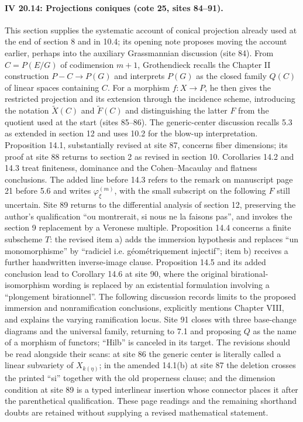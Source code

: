 \documentclass[10pt,a4paper]{article}
\begin{document}
\par{}
\paragraph{IV 20.14: Projections coniques (cote 25, sites 84--91).}
This section supplies the systematic account of conical projection already used at the end of section 8 and in 10.4; its opening note proposes moving the account earlier, perhaps into the auxiliary Grassmannian discussion (site 84). From $C=P(E/G)$ of codimension $m+1$, Grothendieck recalls the Chapter II construction $P-C\to P(G)$ and interprets $P(G)$ as the closed family $Q(C)$ of linear spaces containing $C$. For a morphism $f:X\to P$, he then gives the restricted projection and its extension through the incidence scheme, introducing the notation $\widetilde X(C)$ and $\widetilde F(C)$ and distinguishing the latter $F$ from the quotient used at the start (sites 85--86). The generic-center discussion recalls 5.3 as extended in section 12 and uses 10.2 for the blow-up interpretation. Proposition 14.1, substantially revised at site 87, concerns fiber dimensions; its proof at site 88 returns to section 2 as revised in section 10. Corollaries 14.2 and 14.3 treat finiteness, dominance and the Cohen--Macaulay and flatness conclusions. The added line before 14.3 refers to the remark on manuscript page 21 before 5.6 and writes $\varphi^{(m)}_\xi$, with the small subscript on the following $F$ still uncertain. Site 89 returns to the differential analysis of section 12, preserving the author's qualification ``ou montrerait, si nous ne la faisons pas'', and invokes the section 9 replacement by a Veronese multiple. Proposition 14.4 concerns a finite subscheme $T$: the revised item a) adds the immersion hypothesis and replaces ``un monomorphisme'' by ``radiciel i.e. géométriquement injectif''; item b) receives a further handwritten inverse-image clause. Proposition 14.5 and its added conclusion lead to Corollary 14.6 at site 90, where the original birational-isomorphism wording is replaced by an existential formulation involving a ``plongement birationnel''. The following discussion records limits to the proposed immersion and nonramification conclusions, explicitly mentions Chapter VIII, and explains the varying ramification locus. Site 91 closes with three base-change diagrams and the universal family, returning to 7.1 and proposing $Q$ as the name of a morphism of functors; ``Hilb'' is canceled in its target. The revisions should be read alongside their scans: at site 86 the generic center is literally called a linear subvariety of $X_{k(\eta)}$; in the amended 14.1(b) at site 87 the deletion crosses the printed ``si'' together with the old properness clause; and the dimension condition at site 89 is a typed interlinear insertion whose connector places it after the parenthetical qualification. These page readings and the remaining shorthand doubts are retained without supplying a revised mathematical statement.
\par{}
\end{document}
